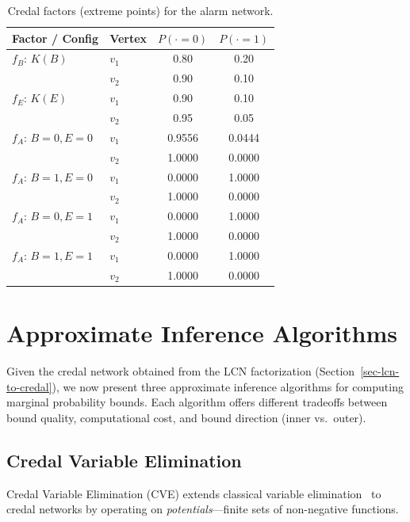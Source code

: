 \documentclass{article}
\begin{document}
\begin{table}[t]
\caption{Credal factors (extreme points) for the alarm network.}
\label{tab:credal-factors}
\centering
\begin{small}
\begin{tabular}{llcc}
\toprule
\textbf{Factor / Config} & \textbf{Vertex} & $P(\cdot{=}0)$ & $P(\cdot{=}1)$ \\
\midrule
$f_B$: $K(B)$ & $v_1$ & 0.80 & 0.20 \\
 & $v_2$ & 0.90 & 0.10 \\
\midrule
$f_E$: $K(E)$ & $v_1$ & 0.90 & 0.10 \\
 & $v_2$ & 0.95 & 0.05 \\
\midrule
$f_A$: $B{=}0, E{=}0$ & $v_1$ & 0.9556 & 0.0444 \\
 & $v_2$ & 1.0000 & 0.0000 \\
$f_A$: $B{=}1, E{=}0$ & $v_1$ & 0.0000 & 1.0000 \\
 & $v_2$ & 1.0000 & 0.0000 \\
$f_A$: $B{=}0, E{=}1$ & $v_1$ & 0.0000 & 1.0000 \\
 & $v_2$ & 1.0000 & 0.0000 \\
$f_A$: $B{=}1, E{=}1$ & $v_1$ & 0.0000 & 1.0000 \\
 & $v_2$ & 1.0000 & 0.0000 \\
\bottomrule
\end{tabular}
\end{small}
\end{table}


\section{Approximate Inference Algorithms}
\label{sec-algorithms}

Given the credal network obtained from the LCN factorization (Section~\ref{sec-lcn-to-credal}), we now present three approximate inference algorithms for computing marginal probability bounds. Each algorithm offers different tradeoffs between bound quality, computational cost, and bound direction (inner vs.\ outer).

\subsection{Credal Variable Elimination}
\label{sec-cve}

Credal Variable Elimination (CVE) extends classical variable elimination~\cite{dechter1999bucket} to credal networks by operating on \emph{potentials}---finite sets of non-negative functions.
\end{document}
